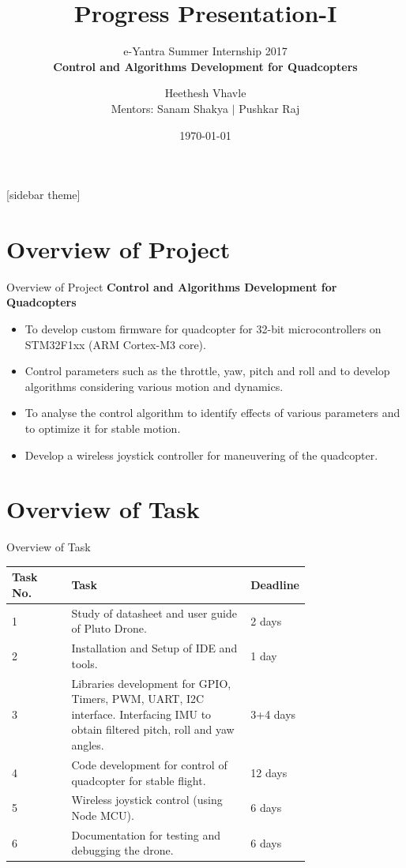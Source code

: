 \documentclass[10pt, a4paper]{beamer}
\begin{document}
	\title{Progress Presentation-I}
	\subtitle{e-Yantra Summer Internship 2017 \\ \bfseries Control and Algorithms Development for Quadcopters}
	\author{Heethesh Vhavle\\
	Mentors: Sanam Shakya $|$ Pushkar Raj}
	\date{\today}
	\frame{\titlepage}

[sidebar theme]
\section{Overview of Project}
\begin{frame}{Overview of Project}
\bfseries Control and Algorithms Development for Quadcopters \\
\hfill \break
\mdseries 
\begin{itemize}
\item To develop custom firmware for quadcopter for 32-bit microcontrollers on STM32F1xx (ARM Cortex-M3 core).\\
\item Control parameters such as the throttle, yaw, pitch and roll and to develop algorithms considering various motion and dynamics.\\
\item To analyse the control algorithm to identify effects of various parameters and to optimize it for stable motion.\\
\item Develop a wireless joystick controller for maneuvering of the quadcopter. 
\end{itemize}
\end{frame}

\section{Overview of Task}
\begin{frame}{Overview of Task}
\begin{tabular}{|l|p{0.6\linewidth}|p{0.15\linewidth}|} 
\hline
Task No. & Task & Deadline\\ \hline
1 & Study of datasheet and user guide of Pluto Drone. & 2 days\\ \hline
2 & Installation and Setup of IDE and tools. & 1 day\\ \hline
3 & Libraries development for GPIO, Timers, PWM, UART, I2C interface. Interfacing IMU to obtain filtered pitch, roll and yaw angles. & 3+4 days\\ \hline
4 & Code development for control of quadcopter for stable flight. & 12 days\\ \hline
5 & Wireless joystick control (using Node MCU). & 6 days\\ \hline
6 & Documentation for testing and debugging the drone. & 6 days\\ \hline
\end{tabular}
\end{frame}
\end{document}
